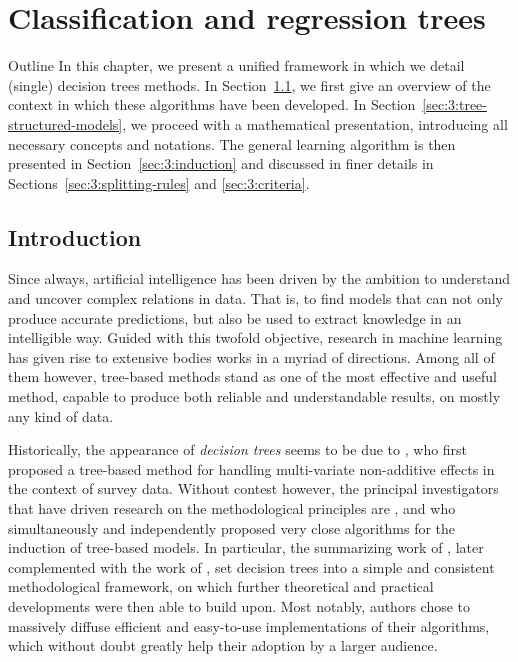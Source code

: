 \chapter{Classification and regression trees}\label{ch:cart}

\begin{remark}{Outline}
In this chapter, we present a unified framework in which we detail
(single) decision trees methods. In Section~\ref{sec:3:introduction}, we
first give an overview of the context in which these algorithms have been developed.
In Section~\ref{sec:3:tree-structured-models}, we proceed with a mathematical
presentation, introducing all necessary concepts and notations. The general learning
algorithm is then presented in Section~\ref{sec:3:induction} and discussed
in finer details in Sections~\ref{sec:3:splitting-rules} and \ref{sec:3:criteria}.
\end{remark}

\section{Introduction}
\label{sec:3:introduction}

Since always, artificial intelligence has been driven by the ambition to
understand and uncover complex relations in data. That is, to find models that
can not only produce accurate predictions, but also be used to extract
knowledge in an intelligible way. Guided with this twofold objective, research
in machine learning has given rise to extensive bodies works in a myriad of
directions. Among all of them however, tree-based methods stand as one of
the most effective and useful method, capable to produce both reliable and
understandable results, on mostly any kind of data.

Historically, the appearance of \textit{decision trees} seems to be due to
\citet{morgan:1963}, who first proposed a tree-based method for handling
multi-variate non-additive effects in the context of survey data. Without contest
however, the principal investigators that have driven research on the
methodological principles  are \citet{breiman:1978a,breiman:1978b},
\citet{friedman:1977,friedman:1979} and \citet{quinlan:1979,quinlan:1986} who
simultaneously and independently proposed very close algorithms for the induction of
tree-based models. In particular, the summarizing work of \citet{breiman:1984}, later complemented with the work of \citet{quinlan:1993},  set decision trees into a simple and consistent methodological framework, on which further theoretical and practical developments were then able to build upon.
Most notably, authors chose to massively diffuse efficient and easy-to-use implementations of their
algorithms, which without doubt greatly help their adoption by a larger audience.



